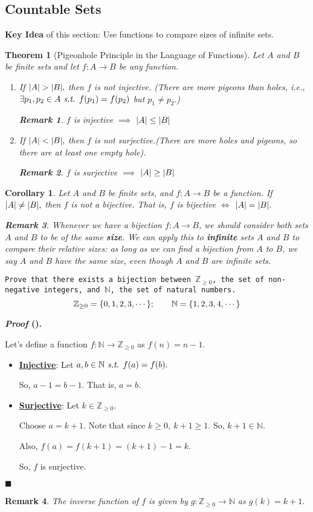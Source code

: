 \documentclass[12pt,a4paper]{article}
\newtheorem{thm}{Theorem}[subsection]
\newtheorem{cor}{Corollary}[section]
\newcounter{nprf}[subsection]
\newtheorem*{rmk}{\indent Remark}
\newenvironment*{prf}{\par\indent\textbf{\textit{Proof} (\stepcounter{nprf}\thenprf). }\par }{\par\hfill $\blacksquare$\par}
\def\Z{{\mathbb{Z}}}
\def\N{{\mathbb{N}}}
\def\st{\emph{ s.t. }}
\begin{document}
\subsection{Countable Sets}
\textbf{Key Idea} of this section: Use functions to compare sizes of infinite sets.
\begin{thm}[Pigeonhole Principle in the Language of Functions]
	Let $A$ and $B$ be finite sets and let $f:A\to B$ be any function.
	\begin{enumerate}
		\item If $\qty|A|>\qty|B|,$ then $f$ is not injective. (There are more pigeons than holes, i.e., $\exists p_1,p_2\in A\st f(p_1)=f(p_2)$ but $p_1\neq p_2.$)
		\begin{rmk}$f$ is injective $\implies$ $\qty|A|\leq\qty|B|$\end{rmk}
		\item If $\qty|A|<\qty|B|,$ then $f$ is not surjective.(There are more holes and pigeons, so there are at least one empty hole). 
		\begin{rmk}$f$ is surjective $\implies$ $\qty|A|\geq\qty|B|$\end{rmk}
	\end{enumerate}	
\end{thm}
\begin{cor}
	Let $A$ and $B$ be finite sets, and $f:A\to B$ be a function. If $\qty|A|\neq\qty|B|,$ then $f$ is not a bijective.	That is, $f$ is bijective $\iff$ $\qty|A|=\qty|B|.$	
	\begin{rmk} Whenever we have a bijection $f:A\to B$, we should consider both sets $A$ and $B$ to be of the same \textbf{size}. We can apply this to \textbf{infinite} sets $A$ and $B$ to compare their relative sizes: as long as we can find a bijection from $A$ to $B$, we say $A$ and $B$ have the same \textit{size}, even though $A$ and $B$ are infinite sets. \end{rmk}
\end{cor}
\begin{framed}
\noindent\texttt{Prove that there exists a bijection between $\Z_{\geq0}$, the set of non-negative integers, and $\N$, the set of natural numbers.}
\[\Z_{\geq0}=\qty{0,1,2,3,\cdots};\qquad\N=\qty{1,2,3,4,\cdots}\]
\begin{prf}\label{prf6.1.1}
	Let's define a function $f:\N\to\Z_{\geq0}$ as $f(n)=n-1.$\par\begin{itemize}
		\item \textbf{\underline{Injective}}: Let $a,b\in\N\st f(a)=f(b).$\par So, $a-1=b-1.$ That is, $a=b.$
		\item \textbf{\underline{Surjective}}: Let $k\in\Z_{\geq0}.$\par Choose $a=k+1.$ Note that since $k\geq0,\ k+1\geq1.$ So, $k+1\in\N.$\par Also, $f(a)=f(k+1)=(k+1)-1=k.$\par So, $f$ is surjective.
	\end{itemize}
\end{prf}
\begin{rmk}The inverse function of $f$ is given by $g:\Z_{\geq0}\to\N$ as $g(k)=k+1.$\end{rmk}
\end{framed}
\end{document}
